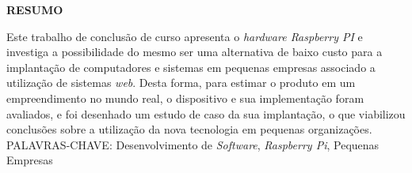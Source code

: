 \begin{center}
\textbf{RESUMO}
\end{center}
\singlespacing

\noindent Este trabalho de conclusão de curso apresenta o \textit{hardware Raspberry PI} e investiga a possibilidade do mesmo ser uma alternativa de baixo custo para a implantação de computadores e sistemas em pequenas empresas associado a utilização de sistemas \textit{web}. Desta forma, para estimar o produto em um empreendimento no mundo real, o dispositivo e sua implementação foram avaliados, e foi desenhado um estudo de caso da sua implantação, o que viabilizou conclusões sobre a utilização da nova tecnologia em pequenas organizações.\\

\noindent PALAVRAS-CHAVE: Desenvolvimento de \textit{Software}, \textit{Raspberry Pi}, Pequenas Empresas
